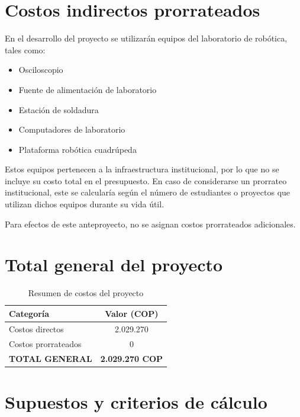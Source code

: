 \section{Costos indirectos prorrateados}

En el desarrollo del proyecto se utilizarán equipos del laboratorio de robótica, tales como:

\begin{itemize}
\item Osciloscopio
\item Fuente de alimentación de laboratorio
\item Estación de soldadura
\item Computadores de laboratorio
\item Plataforma robótica cuadrúpeda
\end{itemize}

Estos equipos pertenecen a la infraestructura institucional, por lo que no se incluye su costo total
en el presupuesto. En caso de considerarse un prorrateo institucional, este se calcularía según el
número de estudiantes o proyectos que utilizan dichos equipos durante su vida útil.

Para efectos de este anteproyecto, no se asignan costos prorrateados adicionales.

\section{Total general del proyecto}

\begin{table}[h]
\centering
\caption{Resumen de costos del proyecto}
\label{tab:resumen_costos}
\begin{tabular}{|l|c|}
\hline
\textbf{Categoría} & \textbf{Valor (COP)} \\
\hline
Costos directos & 2.029.270 \\
Costos prorrateados & 0 \\
\hline
\textbf{TOTAL GENERAL} & \textbf{2.029.270 COP} \\
\hline
\end{tabular}
\end{table}


\section{Supuestos y criterios de cálculo}

